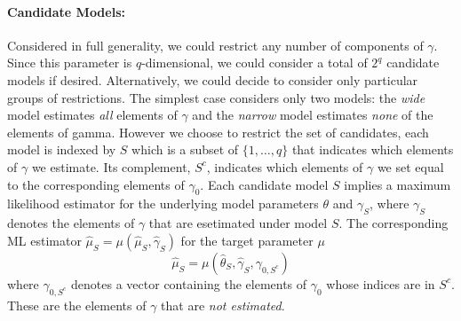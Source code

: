 \documentclass[12pt]{article}
\theoremstyle{definition}
\begin{document}
\paragraph{Candidate Models:} Considered in full generality, we could restrict any number of components of $\gamma$. Since this parameter is $q$-dimensional, we could consider a total of $2^q$ candidate models if desired. Alternatively, we could decide to consider only particular groups of restrictions. The simplest case considers only two models: the \emph{wide} model estimates \emph{all} elements of $\gamma$ and the \emph{narrow} model estimates \emph{none} of the elements of gamma. However we choose to restrict the set of candidates, each model is indexed by $S$ which is a subset of $\{1, \hdots, q\}$ that indicates which elements of $\gamma$ we estimate. Its complement, $S^c$, indicates which elements of $\gamma$ we set equal to the corresponding elements of $\gamma_0$. Each candidate model $S$ implies a maximum likelihood estimator
for the underlying model parameters $\theta$ and $\gamma_S$, where $\gamma_S$ denotes the elements of $\gamma$ that are esetimated under model $S$. The corresponding ML estimator $\widehat{\mu}_S = \mu\left(\widehat{\mu}_S, \widehat{\gamma}_S \right)$ for the target parameter $\mu$
	$$\widehat{\mu}_S = \mu\left(\widehat{\theta}_S, \widehat{\gamma}_S, \gamma_{0,S^c} \right)$$
where $\gamma_{0,S^c}$ denotes a vector containing the elements of $\gamma_0$ whose indices are in $S^c$. These are the elements of $\gamma$ that are \emph{not estimated}. 
\end{document}
